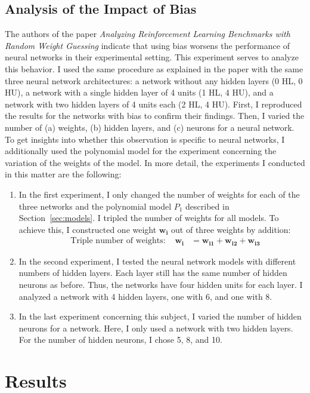 \subsection{Analysis of the Impact of Bias}
The authors of the paper \emph{Analyzing Reinforcement Learning Benchmarks with Random Weight Guessing} indicate that using bias worsens the performance of neural networks in their experimental setting. This experiment serves to analyze this behavior. I used the same procedure as explained in the paper with the same three neural network architectures: a network without any hidden layers (0 HL, 0 HU), a network with a single hidden layer of 4 units (1 HL, 4 HU), and a network with two hidden layers of 4 units each (2 HL, 4 HU). First, I reproduced the results for the networks with bias to confirm their findings. Then, I varied the number of (a) weights, (b) hidden layers, and (c) neurons for a neural network. To get insights into whether this observation is specific to neural networks, I additionally used the polynomial model for the experiment concerning the variation of the weights of the model. In more detail, the experiments I conducted in this matter are the following:
\begin{enumerate}[label=(\alph*)]
  \item In the first experiment, I only changed the number of weights for each of the three networks and the polynomial model $P_1$ described in Section~\ref{sec:models}. I tripled the number of weights for all models. To achieve this, I constructed one weight $\mathbf{w_i}$ out of three weights by addition:
  \begin{align*}
    &\text{Triple number of weights: } &\mathbf{w_{i}} &= \mathbf{w_{i1}} + \mathbf{w_{i2}} + \mathbf{w_{i3}}
  \end{align*}
  \item In the second experiment, I tested the neural network models with different numbers of hidden layers. Each layer still has the same number of hidden neurons as before. Thus, the networks have four hidden units for each layer. I analyzed a network with 4 hidden layers, one with 6, and one with 8.
  \item In the last experiment concerning this subject, I varied the number of hidden neurons for a network. Here, I only used a network with two hidden layers. For the number of hidden neurons, I chose 5, 8, and 10.
\end{enumerate}

\section{Results}
